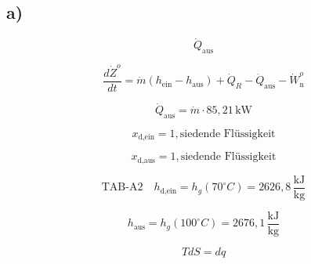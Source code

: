 

\subsection*{a)}

\[
\dot{Q}_{\text{aus}}
\]

\[
\frac{d\dot{Z}^o}{dt} = \dot{m} (h_{\text{ein}} - h_{\text{aus}}) + \dot{Q}_R - \dot{Q}_{\text{aus}} - \dot{W}^o_{\text{n}}
\]

\[
\dot{Q}_{\text{aus}} = \dot{m} \cdot 85,21 \, \text{kW}
\]

\[
x_{\text{d,ein}} = 1, \text{siedende Flüssigkeit}
\]

\[
x_{\text{d,aus}} = 1, \text{siedende Flüssigkeit}
\]

\[
\text{TAB-A2} \quad h_{\text{d,ein}} = h_g(70^\circ C) = 2626,8 \, \frac{\text{kJ}}{\text{kg}}
\]

\[
h_{\text{aus}} = h_g(100^\circ C) = 2676,1 \, \frac{\text{kJ}}{\text{kg}}
\]

\[
T dS = dq
\]